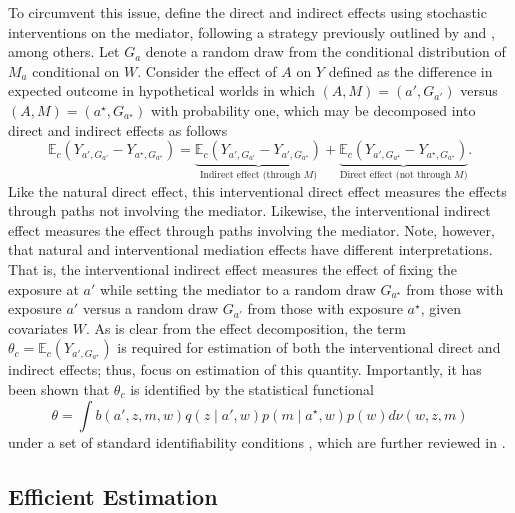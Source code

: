 \documentclass[
  12pt,
]{book}
\theoremstyle{definition}
\theoremstyle{definition}
\theoremstyle{definition}
\newcommand{\1}{\mathbbm{1}}
\begin{document}
To circumvent this issue, \citet{diaz2020nonparametric} define the direct and indirect
effects using stochastic interventions on the mediator, following a strategy
previously outlined by \citet{vanderweele2014effect} and \citet{rudolph2017robust}, among
others. Let \(G_a\) denote a random draw from the conditional distribution of
\(M_a\) conditional on \(W\). Consider the effect of \(A\) on \(Y\) defined as the
difference in expected outcome in hypothetical worlds in which \((A,M) = (a', G_{a'})\) versus \((A,M) = (a^{\star}, G_{a^{\star}})\) with probability one, which
may be decomposed into direct and indirect effects as follows
\begin{equation*}
\mathbb{E}_c(Y_{a', G_{a'}} - Y_{a^{\star}, G_{a^{\star}}}) =
  \underbrace{\mathbb{E}_c(Y_{a', G_{a'}} - Y_{a',
    G_{a^{\star}}})}_{\text{Indirect effect (through $M$)}} +
  \underbrace{\mathbb{E}_c(Y_{a', G_{a^{\star}}} - Y_{a^{\star},
      G_{a^{\star}}})}_{\text{Direct effect (not through $M$)}}.
\end{equation*}
Like the natural direct effect, this interventional direct effect measures the
effects through paths not involving the mediator. Likewise, the interventional
indirect effect measures the effect through paths involving the mediator. Note,
however, that natural and interventional mediation effects have different
interpretations. That is, the interventional indirect effect measures the effect
of fixing the exposure at \(a'\) while setting the mediator to a random draw
\(G_{a^{\star}}\) from those with exposure \(a'\) versus a random draw \(G_{a'}\) from
those with exposure \(a^{\star}\), given covariates \(W\). As is clear from the
effect decomposition, the term \(\theta_c = \mathbb{E}_c(Y_{a', G_{a^{\star}}})\)
is required for estimation of both the interventional direct and indirect
effects; thus, \citet{diaz2020nonparametric} focus on estimation of this quantity.
Importantly, it has been shown that \(\theta_c\) is identified by the statistical
functional
\begin{equation*}
  \theta = \int b(a', z, m, w) q(z \mid a', w) p(m \mid a^{\star}, w)
    p(w) d\nu(w,z,m)
\end{equation*}
under a set of standard identifiability conditions \citep{vanderweele2014effect},
which are further reviewed in \citet{diaz2020nonparametric}.

\hypertarget{efficient-estimation}{%
\subsection{Efficient Estimation}\label{efficient-estimation}}
\end{document}
